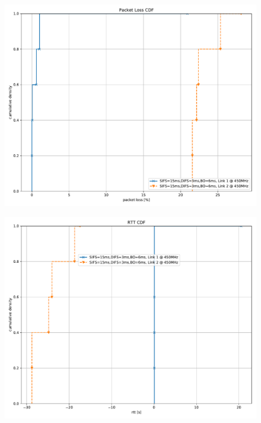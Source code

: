 \documentclass{article}
\begin{document}
\begin{figure}
	\includegraphics[width=\textwidth]{rb_high_dual/cdf/packet_loss_cdf}
\end{figure}

\begin{figure}
	\includegraphics[width=\textwidth]{rb_high_dual/cdf/rtt_cdf}
\end{figure}
\end{document}
